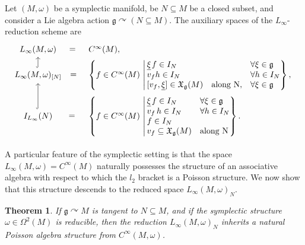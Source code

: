 \documentclass[10pt,a4paper]{amsart}
\numberwithin{equation}{section}
\newtheorem{Theorem}{Theorem}[section]
\DeclareMathOperator{\action}{\curvearrowright}
\newcommand{\g}{\mathfrak{g}}
\newcommand{\fgmodule}{\mathfrak{X}_{\g}}
\renewcommand{\subset}{\subseteq}
\begin{document}
Let $(M,\omega)$ be a symplectic manifold, be $N\subset M$ be a closed subset, and consider a Lie algebra action $\mathfrak{g}\action (N\subset M)$.
The auxiliary spaces of the $L_\infty$-reduction scheme are
\begin{equation}\label{diagram:symplectic-ingredients}
	\begin{tikzcd}[
		ampersand replacement = \&
		,row sep = 0ex
		,/tikz/column 2/.append style={anchor=base west}
		]
		L_\infty(M,\omega) \ar[r,phantom,"="] \&
		C^\infty(M),
		\\
		L_\infty(M,\omega)_{[N]} \ar[r,phantom,pos=0.42,"="] \ar[u,hook]\&
		\left\lbrace
		f\in C^\infty(M)
		\,\left\vert \,
		\begin{array}{@{}l r l@{}}
			\underline\xi\hspace{1pt} f \in I_N &&\forall \xi \in \mathfrak{g}\\
			v_f h\in I_N && \forall h \in I_N
			\\
			{[v_f,\underline{\xi}]} \in \fgmodule(M)  & \text{along N},
			& \forall \xi \in \g
		\end{array}
		\right\rbrace,\right.
		\\
		I_{L_\infty}(N) \ar[r,phantom,pos=0.55,"="] \ar[u,hook]\&
		\left\lbrace
		f\in C^\infty(M)
		\,\left\vert \,
		\begin{array}{@{}l l@{}}
			\underline\xi\hspace{1pt} f \in I_N & \forall \xi \in \mathfrak{g}\\
			v_f \,h \in I_N & \forall h \in I_N
			\\
			f \in I_N\\
			v_f \subset \fgmodule(M) & \text{along N}
		\end{array}
		\right\rbrace.\right.
	\end{tikzcd}
\end{equation}

A particular feature of the symplectic setting is that the space $L_\infty(M,\omega)=C^\infty(M)$ naturally possesses the structure of an associative algebra with respect to which the $l_2$ bracket is a Poisson structure. We now show that this structure descends to the reduced space $L_\infty(M,\omega)_N$.

\begin{Theorem}%
	If $\g\curvearrowright M$ is tangent to $N\subset M$, and if the symplectic structure $\omega\in\Omega^2(M)$ is reducible, then the reduction $L_\infty(M,\omega)_N$ inherits a natural Poisson algebra structure from $C^\infty(M,\omega)$.
\end{Theorem}
\end{document}

